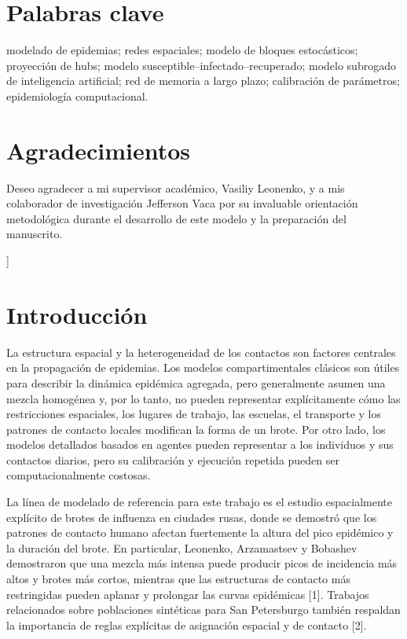 \documentclass[12pt,a4paper,twocolumn]{article}
\begin{document}
\begin{@twocolumnfalse}
\section*{Palabras clave}

modelado de epidemias; redes espaciales; modelo de bloques estocásticos; proyección de hubs; modelo susceptible--infectado--recuperado; modelo subrogado de inteligencia artificial; red de memoria a largo plazo; calibración de parámetros; epidemiología computacional.

\section*{Agradecimientos}

Deseo agradecer a mi supervisor académico, Vasiliy Leonenko, y a mis colaborador  de investigación Jefferson Vaca por su invaluable orientación metodológica durante el desarrollo de este modelo y la preparación del manuscrito.

\vspace{1em}

\end{@twocolumnfalse}
]


\section*{Introducción}

La estructura espacial y la heterogeneidad de los contactos son factores centrales en la propagación de epidemias. Los modelos compartimentales clásicos son útiles para describir la dinámica epidémica agregada, pero generalmente asumen una mezcla homogénea y, por lo tanto, no pueden representar explícitamente cómo las restricciones espaciales, los lugares de trabajo, las escuelas, el transporte y los patrones de contacto locales modifican la forma de un brote. Por otro lado, los modelos detallados basados en agentes pueden representar a los individuos y sus contactos diarios, pero su calibración y ejecución repetida pueden ser computacionalmente costosas.

La línea de modelado de referencia para este trabajo es el estudio espacialmente explícito de brotes de influenza en ciudades rusas, donde se demostró que los patrones de contacto humano afectan fuertemente la altura del pico epidémico y la duración del brote. En particular, Leonenko, Arzamastsev y Bobashev demostraron que una mezcla más intensa puede producir picos de incidencia más altos y brotes más cortos, mientras que las estructuras de contacto más restringidas pueden aplanar y prolongar las curvas epidémicas [1]. Trabajos relacionados sobre poblaciones sintéticas para San Petersburgo también respaldan la importancia de reglas explícitas de asignación espacial y de contacto [2].
\end{document}

